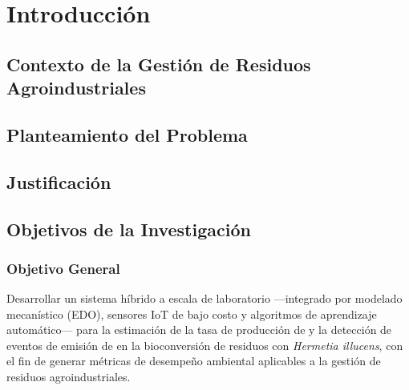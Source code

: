 \documentclass[10pt,spanish,fleqn,openany,twoside,letterpaper]{book}
\begin{document}
%
%
%

%
%
%
%
%



\chapter{Introducción}

\section{Contexto de la Gestión de Residuos Agroindustriales}

\section{Planteamiento del Problema}


\section{Justificación}

\section{Objetivos de la Investigación}

    \subsection{Objetivo General}
    Desarrollar un sistema híbrido a escala de laboratorio —integrado por modelado mecanístico (EDO), sensores IoT de bajo costo y algoritmos de aprendizaje automático— para la estimación de la tasa de producción de  y la detección de eventos de emisión de  en la bioconversión de residuos con \textit{Hermetia illucens}, con el fin de generar métricas de desempeño ambiental aplicables a la gestión de residuos agroindustriales.
\end{document}
